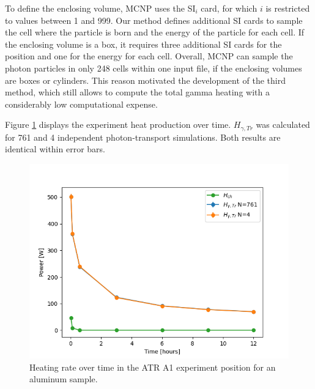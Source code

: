 To define the enclosing volume, MCNP uses the SI$_i$ card, for which $i$ is restricted to values between 1 and 999.
Our method defines additional SI cards to sample the cell where the particle is born and the energy of the particle for each cell.
If the enclosing volume is a box, it requires three additional SI cards for the position and one for the energy for each cell.
Overall, MCNP can sample the photon particles in only 248 cells within one input file, if the enclosing volumes are boxes or cylinders.
This reason motivated the development of the third method, which still allows to compute the total gamma heating with a considerably low computational expense.

Figure \ref{fig:atr-time2} displays the experiment heat production over time.
$H_{\gamma,Tr}$ was calculated for 761 and 4 independent photon-transport simulations.
Both results are identical within error bars.

\begin{figure}[htbp!] %
    \centering
    \includegraphics[width=0.55\linewidth]{figures/atr-decay-heat-time2}
    \hfill
    \caption{Heating rate over time in the ATR A1 experiment position for an aluminum sample.}
    \label{fig:atr-time2}
\end{figure}
